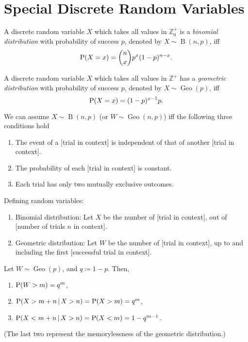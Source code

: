 \documentclass[oneside]{book}
\begin{document}
\chapter{Special Discrete Random Variables}
\begin{definition}{}{}
  A discrete random variable \(X\) which takes all values in \(\mathbb{Z}^{+}_{0}\) is a \emph{binomial distribution} with probability of success \(p\), denoted by \(X \sim \operatorname{B}(n,p)\), iff
  \[\operatorname{P}(X=x)=\binom{n}{x}p^x(1-p)^{n-x}.\]
\end{definition}
\begin{definition}{}{}
  A discrete random variable \(X\) which takes all values in \(\mathbb{Z}^{+}\) has a \emph{geometric distribution} with probability of success \(p\), denoted by \(X \sim \operatorname{Geo}(p)\), iff
  \[\operatorname{P}(X=x)=(1-p)^{x-1}p.\]
\end{definition}
\begin{note}
  We can assume \(X \sim \operatorname{B}(n,p)\) (or \(W \sim \operatorname{Geo}(n,p)\)) iff the following three conditions hold
  \begin{enumerate}
    \item The event of a [trial in context] is independent of that of another [trial in context].
    \item The probability of each [trial in context] is constant.
    \item Each trial has only two mutually exclusive outcomes.
  \end{enumerate}
\end{note}
\begin{note}
  Defining random variables:
  \begin{enumerate}
    \item Binomial distribution: Let \(X\) be the number of [trial in context], out of [number of trials \(n\) in context]. 
    \item Geometric distribution: Let \(W\) be the number of [trial in context], up to and including the first [successful trial in context].
  \end{enumerate}
\end{note}
\begin{note}
  Let \(W \sim \operatorname{Geo}(p)\), and \(q\coloneq 1-p\). Then,
  \begin{enumerate}
    \item \(\operatorname{P}(W>m)=q^m\),
    \item \(\operatorname{P}(X>m+n \,\vert\, X>n)=\operatorname{P}(X>m)=q^m\),\item \(\operatorname{P}(X<m+n \,\vert\, X>n)=\operatorname{P}(X<m)=1-q^{m-1}\).
  \end{enumerate}
  (The last two represent the memorylessness of the geometric distribution.)
\end{note}
\end{document}
